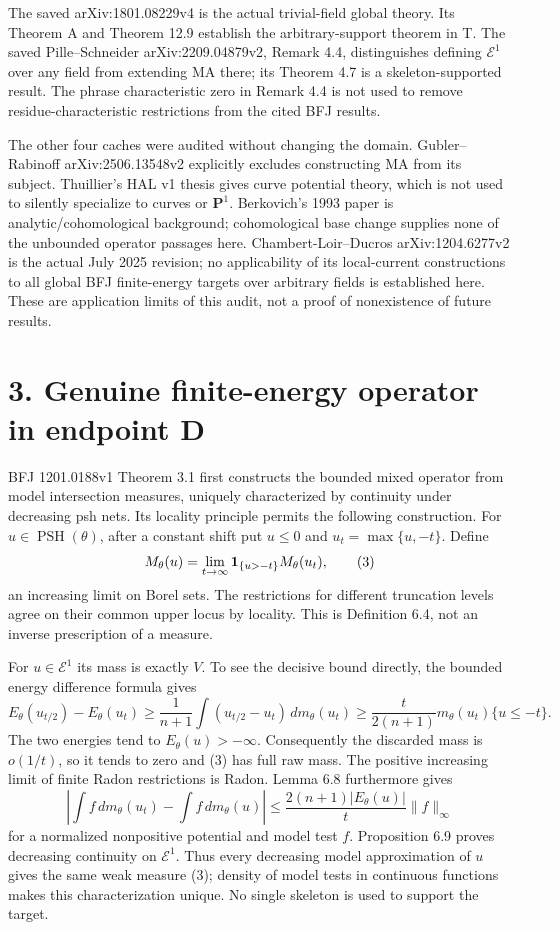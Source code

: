 \documentclass[11pt]{article}
\begin{document}
The saved arXiv:1801.08229v4 is the actual trivial-field global theory. Its Theorem A and Theorem 12.9 establish the arbitrary-support theorem in T. The saved Pille--Schneider arXiv:2209.04879v2, Remark 4.4, distinguishes defining \(\mathcal E^1\) over any field from extending MA there; its Theorem 4.7 is a skeleton-supported result. The phrase characteristic zero in Remark 4.4 is not used to remove residue-characteristic restrictions from the cited BFJ results.

The other four caches were audited without changing the domain. Gubler--Rabinoff arXiv:2506.13548v2 explicitly excludes constructing MA from its subject. Thuillier's HAL v1 thesis gives curve potential theory, which is not used to silently specialize to curves or \(\mathbf P^1\). Berkovich's 1993 paper is analytic/cohomological background; cohomological base change supplies none of the unbounded operator passages here. Chambert-Loir--Ducros arXiv:1204.6277v2 is the actual July 2025 revision; no applicability of its local-current constructions to all global BFJ finite-energy targets over arbitrary fields is established here. These are application limits of this audit, not a proof of nonexistence of future results.

\section*{3. Genuine finite-energy operator in endpoint D}

BFJ 1201.0188v1 Theorem 3.1 first constructs the bounded mixed operator from model intersection measures, uniquely characterized by continuity under decreasing psh nets. Its locality principle permits the following construction. For \(u\in\operatorname{PSH}(\theta)\), after a constant shift put \(u\leq0\) and \(u_t=\max\{u,-t\}\). Define
\[
 M_\theta(u)=\lim_{t\to\infty}
 {\bf1}_{\{u>-t\}}M_\theta(u_t),
 \tag{3}
\]
an increasing limit on Borel sets. The restrictions for different truncation levels agree on their common upper locus by locality. This is Definition 6.4, not an inverse prescription of a measure.

For \(u\in\mathcal E^1\) its mass is exactly \(V\). To see the decisive bound directly, the bounded energy difference formula gives
\[
 E_\theta(u_{t/2})-E_\theta(u_t)
 \geq\frac1{n+1}\int(u_{t/2}-u_t)\,dm_\theta(u_t)
 \geq\frac{t}{2(n+1)}m_\theta(u_t)\{u\leq-t\}.
 \tag{4}
\]
The two energies tend to \(E_\theta(u)>-\infty\). Consequently the discarded mass is \(o(1/t)\), so it tends to zero and (3) has full raw mass. The positive increasing limit of finite Radon restrictions is Radon. Lemma 6.8 furthermore gives
\[
 \left|\int f\,dm_\theta(u_t)-\int f\,dm_\theta(u)\right|
 \leq\frac{2(n+1)|E_\theta(u)|}{t}\|f\|_\infty
 \tag{5}
\]
for a normalized nonpositive potential and model test \(f\). Proposition 6.9 proves decreasing continuity on \(\mathcal E^1\). Thus every decreasing model approximation of \(u\) gives the same weak measure (3); density of model tests in continuous functions makes this characterization unique. No single skeleton is used to support the target.
\end{document}

